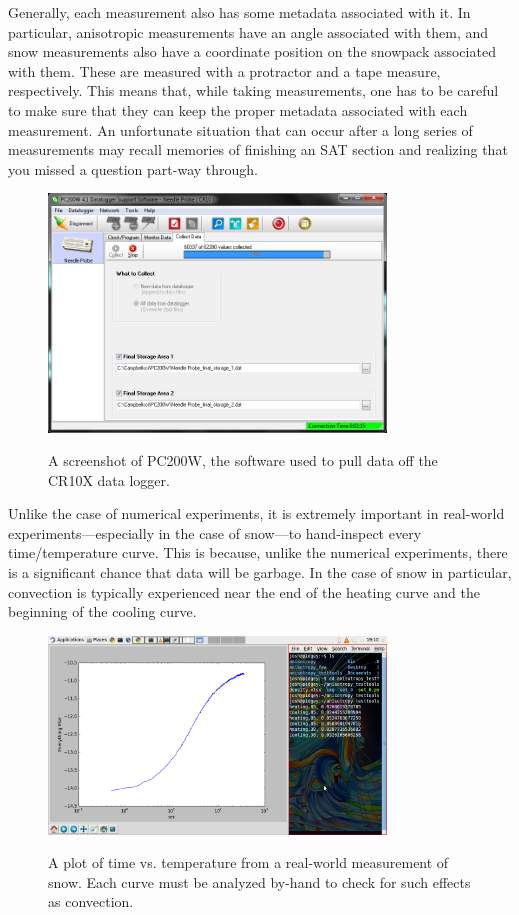 Generally, each measurement also has some metadata associated with it. In
particular, anisotropic measurements have an angle associated with them, and
snow measurements also have a coordinate position on the snowpack associated
with them. These are measured with a protractor and a tape measure,
respectively. This means that, while taking measurements, one has to be careful
to make sure that they can keep the proper metadata associated with each
measurement. An unfortunate situation that can occur after a long series of
measurements may recall memories of finishing an SAT section and realizing that
you missed a question part-way through. 

\begin{figure}[h]
\centering
\includegraphics[width=0.8\textwidth]{fig/pc200w.png}
\label{fig:pc200w}
\caption{A screenshot of PC200W, the software used to pull data off the CR10X data logger.}
\end{figure}

Unlike the case of numerical experiments, it is extremely important in
real-world experiments---especially in the case of snow---to hand-inspect every
time/temperature curve. This is because, unlike the numerical experiments, there
is a significant chance that data will be garbage. In the case of snow in
particular, convection is typically experienced near the end of the heating
curve and the beginning of the cooling curve.

\begin{figure}[h]
\centering
\includegraphics[width=0.8\textwidth]{fig/measurement_graph.png}
\label{fig:meas_graph}
\caption{A plot of time vs. temperature from a real-world measurement of snow.
Each curve must be analyzed by-hand to check for such effects as convection.}
\end{figure}



